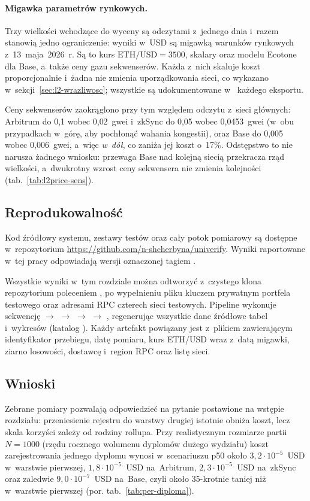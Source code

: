 \paragraph{Migawka parametrów rynkowych.} Trzy wielkości wchodzące do wyceny są
odczytami z~jednego dnia i~razem stanowią jedno ograniczenie: wyniki w~USD są
migawką warunków rynkowych z~13~maja~2026~r. Są to kurs
$\text{ETH}/\text{USD}=3500$, skalary  oraz
 modelu Ecotone~\cite{op-stack} dla Base, a~także ceny
gazu sekwenserów. Każda z~nich skaluje koszt proporcjonalnie i~żadna nie zmienia
uporządkowania sieci, co wykazano w~sekcji~\ref{sec:l2-wrazliwosc}; wszystkie są
udokumentowane w~ każdego eksportu.

Ceny sekwenserów zaokrąglono przy tym względem odczytu 
z~sieci głównych: Arbitrum do 0{,}1 wobec 0{,}02~gwei i~zkSync do 0{,}05 wobec
0{,}0453~gwei (w~obu przypadkach w~górę, aby pochłonąć wahania kongestii),
oraz Base do 0{,}005 wobec 0{,}006~gwei, a~więc \emph{w~dół}, co zaniża jej koszt
o~17\%. Odstępstwo to nie narusza żadnego wniosku: przewaga Base nad kolejną
siecią przekracza rząd wielkości, a~dwukrotny wzrost ceny sekwensera nie zmienia
kolejności (tab.~\ref{tab:l2price-sens}).

\subsection{Reprodukowalność}
Kod źródłowy systemu, zestawy testów oraz cały potok pomiarowy są dostępne
w~repozytorium \url{https://github.com/n-shcherbyna/univerify}. Wyniki
raportowane w~tej pracy odpowiadają wersji oznaczonej tagiem
.

Wszystkie wyniki w~tym rozdziale można odtworzyć z~czystego klona repozytorium
poleceniem , po wypełnieniu
pliku  kluczem prywatnym portfela testowego oraz adresami RPC czterech
sieci testowych. Pipeline wykonuje sekwencję  $\to$ 
$\to$  $\to$  $\to$ , regenerując wszystkie
dane źródłowe tabel i~wykresów (katalog ). Każdy artefakt powiązany jest z~plikiem 
zawierającym identyfikator przebiegu, datę pomiaru, kurs ETH/USD wraz z~datą
migawki, ziarno losowości, dostawcę i~region RPC oraz listę sieci.

\subsection{Wnioski}
\label{sec:l2-wnioski}
Zebrane pomiary pozwalają odpowiedzieć na pytanie postawione na wstępie rozdziału:
przeniesienie rejestru do warstwy drugiej istotnie obniża koszt, lecz skala
korzyści zależy od rodziny rollupa. Przy realistycznym rozmiarze partii $N=1000$
(rzędu rocznego wolumenu dyplomów dużego wydziału) koszt zarejestrowania jednego
dyplomu wynosi w~scenariuszu p50 około $3{,}2\cdot10^{-5}$~USD w~warstwie pierwszej,
$1{,}8\cdot10^{-5}$~USD na~Arbitrum, $2{,}3\cdot10^{-5}$~USD na~zkSync oraz zaledwie
$9{,}0\cdot10^{-7}$~USD na~Base, czyli około 35-krotnie taniej niż w~warstwie
pierwszej (por. tab.~\ref{tab:per-diploma}).

